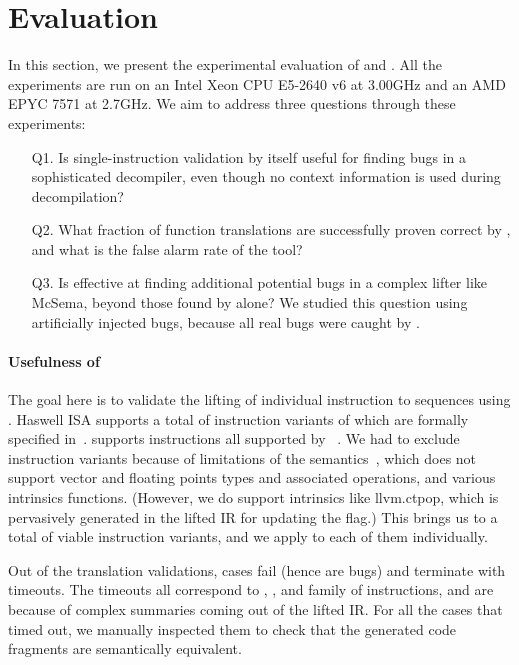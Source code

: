 \section{Evaluation} \label{sec:eval}
In this section, we present the experimental evaluation of 
\siv and \plv. All the experiments are run on an Intel Xeon CPU E5-2640 v6 at 3.00GHz
and an AMD  EPYC 7571 at 2.7GHz.  We aim to address three questions through these
experiments:
%
\begin{itemize}
  \item[Q1.] Is single-instruction validation by itself useful for finding bugs in
  a sophisticated decompiler, even though no context information is used during 
  decompilation?
  \item[Q2.] What fraction of function translations are successfully proven correct
  by \plv, and what is the false alarm rate of the tool?
  \item[Q3.] Is \plv effective at finding additional potential bugs in a complex 
  lifter like McSema, beyond those found by \siv alone?  We studied this question
  using artificially injected bugs, because all real bugs were caught by \siv.
\end{itemize}

\paragraph{Usefulness of \siv}
The goal here is to validate the lifting of individual \ISA instruction to 
\LLVM sequences using \mcsema. 
Haswell \ISA ISA supports a total of \totalIS instruction variants of which 
\currentIS are formally specified in~\cite{DasguptaAdve:PLDI19}. \mcsema 
supports \mcsemaIS instructions all supported by ~\cite{DasguptaAdve:PLDI19}.
We had to exclude \sivExc instruction variants because of limitations 
of the \LLVM semantics~\cite{LLVMSEMA}, which does not support vector and floating 
points types and associated operations, and various intrinsics 
functions. (However, we do support intrinsics like llvm.ctpop, which is 
pervasively generated in the lifted IR for updating the  flag.) This 
brings us to a total of \sivIS viable instruction variants, and we apply
\TV to each of them individually.

Out of the \sivIS translation validations, \sivFail cases fail (hence are bugs) and 
\sivTO terminate with timeouts. The timeouts all correspond to , 
, and  family of instructions, and are because of
complex summaries coming out of the lifted IR. For all the cases that timed out,
we manually inspected them to check that the generated code fragments are 
semantically equivalent.

